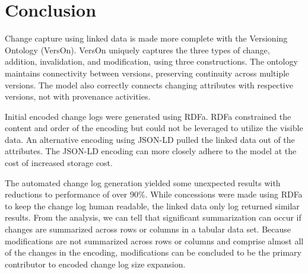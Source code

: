 \section{Conclusion}

Change capture using linked data is made more complete with the Versioning Ontology (VersOn).
VersOn uniquely captures the three types of change, addition, invalidation, and modification, using three constructions.
The ontology maintains connectivity between versions, preserving continuity across multiple versions.
The model also correctly connects changing attributes with respective versions, not with provenance activities.

Initial encoded change logs were generated using RDFa.
RDFa constrained the content and order of the encoding but could not be leveraged to utilize the visible data.
An alternative encoding using JSON-LD pulled the linked data out of the attributes.
The JSON-LD encoding can more closely adhere to the model at the cost of increased storage cost.

The automated change log generation yielded some unexpected results with reductions to performance of over 90\%.
While concessions were made using RDFa to keep the change log human readable, the linked data only log returned similar results.
From the analysis, we can tell that significant summarization can occur if changes are summarized across rows or columns in a tabular data set.
Because modifications are not summarized across rows or columns and comprise almost all of the changes in the encoding, modifications can be concluded to be the primary contributor to encoded change log size expansion.